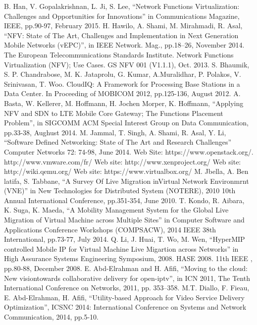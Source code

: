\documentclass[letterpaper,conference]{IEEEtran}
\begin{document}


\begin{thebibliography}{1}
\bibitem[1]{[1]} B. Han, V. Gopalakrishnan, L. Ji, S. Lee, “Network Functions Virtualization: Challenges and Opportunities for Innovations” in Communications Magazine, IEEE, pp.90-97, February 2015.
\bibitem[2]{[2]} H. Hawilo, A. Shami, M. Mirahmadi, R. Asal, “NFV: State of The Art, Challenges and Implementation in Next Generation Mobile Networks
(vEPC)”, in IEEE Network. Mag., pp.18–26, November 2014.
\bibitem[3]{[3]} The European Telecommunications Standards Institute. Network Functions Virtualization (NFV); Use Cases. GS NFV 001 (V1.1.1), Oct. 2013.
\bibitem[4]{[4]} S. Bhaumik, S. P. Chandrabose, M. K. Jataprolu, G. Kumar, A.Muralidhar, P. Polakos, V. Srinivasan, T. Woo. CloudIQ: A Framework for Processing Base Stations in a Data Center. In Proceeding of MOBICOM 2012, pp.125-136, August 2012.
\bibitem[5]{[5]} A. Basta, W. Kellerer, M. Hoffmann, H. Jochen Morper, K. Hoffmann, “Applying NFV and SDN to LTE Mobile Core Gateway; The Functions Placement Problem”, in SIGCOMM ACM Special Interest Group on Data Communication, pp.33-38, Aughust 2014.
\bibitem[6]{[6]} M. Jammal, T. Singh, A. Shami, R. Asal, Y. Li, “Software Defined Networking: State of The Art and Research Challenges” Computer Networks 72: 74-98, June 2014.
\bibitem[7]{[7]} Web Site: https://www.openstack.org/.
\bibitem[8]{[8]} http://www.vmware.com/fr/
\bibitem[9]{[9]} Web site: http://www.xenproject.org/
\bibitem[10]{[10]} Web site: http://wiki.qemu.org/
\bibitem[11]{[11]} Web site: https://www.virtualbox.org/
\bibitem[12]{[12]} M. Jbella, A. Ben latifa, S. Tabbane, “A Survey Of Live Migration
inVirtual Network Environmrnt (VNE)” in New Technologies for Distributed System (NOTERE), 2010 10th Annual International Conference, pp.351-354, June 2010.
\bibitem[13]{[13]} T. Kondo, R. Aibara, K. Suga, K. Maeda, “A Mobility Management
System for the Global Live Migration of Virtual Machine across
Multiple Sites” in Computer Software and Applications Conference Workshops (COMPSACW), 2014 IEEE 38th International, pp.73-77, July 2014.
\bibitem[14]{[14]} Q. Li, J. Huai, T. Wo, M. Wen, “HyperMIP controlled Mobile IP for Virtual Machine Live Migartion across Networks” in High Assurance Systems Engineering Symposium, 2008. HASE 2008. 11th IEEE , pp.80-88, December 2008.
\bibitem[15]{[15]} E. Abd-Elrahman and H. Afifi, “Moving to the cloud: New visiontowards collaborative delivery for open-iptv”, in ICN 2011, The Tenth International Conference on Networks, 2011, pp. 353–358.
\bibitem[16]{[16]} M.T. Diallo, F. Fieau, E. Abd-Elrahman, H. Afifi, “Utility-based Approach for Video Service Delivery Optimization”, ICSNC 2014: International Conference on Systems and Network Communication, 2014, pp.5-10.

\end{thebibliography}
\end{document}
